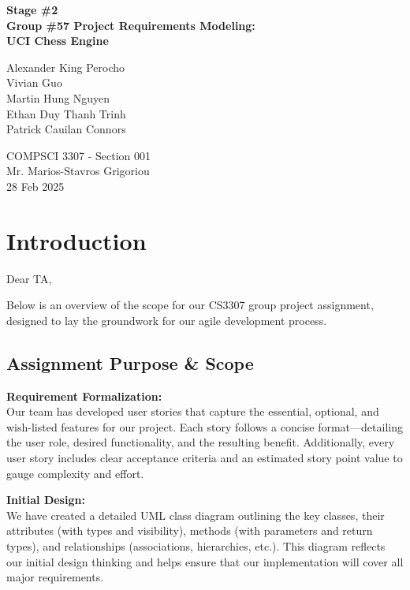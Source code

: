 \documentclass[12pt]{article}
\begin{document}
\begin{titlepage}
    \centering
    \vspace*{1in}
    {\huge \bfseries Stage \#2\\[1ex]
    Group \#57 Project Requirements Modeling: \\ UCI Chess Engine\par}
    \vspace{1.5in}
    {\Large
    Alexander King Perocho\\[0.3em]
    Vivian Guo\\[0.3em]
    Martin Hung Nguyen\\[0.3em]
    Ethan Duy Thanh Trinh\\[0.3em]
    Patrick Cauilan Connors\par}
    \vspace{1.5in}
    {\Large COMPSCI 3307 - Section 001\\[0.3em]
    Mr. Marios-Stavros Grigoriou\\[0.3em]
    28 Feb 2025\par}
    \vfill
\end{titlepage}

\tableofcontents
\newpage

\section{Introduction}

Dear TA,

Below is an overview of the scope for our CS3307 group project assignment, designed to lay the groundwork for our agile development process.

\subsection{Assignment Purpose \& Scope}

\textbf{Requirement Formalization:} \\
Our team has developed user stories that capture the essential, optional, and wish-listed features for our project. Each story follows a concise format—detailing the user role, desired functionality, and the resulting benefit. Additionally, every user story includes clear acceptance criteria and an estimated story point value to gauge complexity and effort.

\textbf{Initial Design:} \\
We have created a detailed UML class diagram outlining the key classes, their attributes (with types and visibility), methods (with parameters and return types), and relationships (associations, hierarchies, etc.). This diagram reflects our initial design thinking and helps ensure that our implementation will cover all major requirements.
\end{document}
